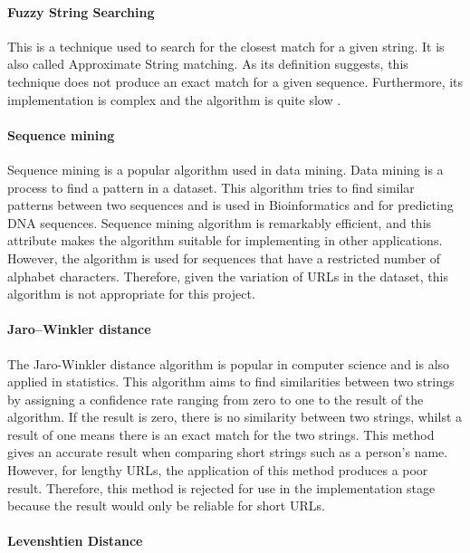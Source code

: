 \paragraph{Fuzzy String Searching}
			
This is a technique used to search for the closest match for a given string. It is also called Approximate String matching. As its definition suggests, this technique does not produce an exact match for a given sequence. Furthermore, its implementation is complex and the algorithm is quite slow \cite{String-match}.

\paragraph{Sequence mining}

Sequence mining is a popular algorithm used in data mining. Data mining is a process to find a pattern in a dataset. This algorithm tries to find similar patterns between two sequences and is used in Bioinformatics and for predicting DNA sequences. Sequence mining algorithm is remarkably efficient, and this attribute makes the algorithm suitable for implementing in other applications. However, the algorithm is used for sequences that have a restricted number of alphabet characters. Therefore, given the variation of URLs in the dataset, this algorithm is not appropriate for this project\cite{Sequence-mining}.  

\paragraph{Jaro–Winkler distance}

The Jaro-Winkler distance algorithm is popular in computer science and is also applied in statistics. This algorithm aims to find similarities between two strings by assigning a confidence rate ranging from zero to one to the result of the algorithm. If the result is zero, there is no similarity between two strings, whilst a result of one means there is an exact match for the two strings. This method gives an accurate result when comparing short strings such as a person’s name. However, for lengthy URLs, the application of this method produces a poor result. Therefore, this method is rejected for use in the implementation stage because the result would only be reliable for short URLs\cite{Jargo-winkle}. 

\paragraph{Levenshtien Distance}
	
